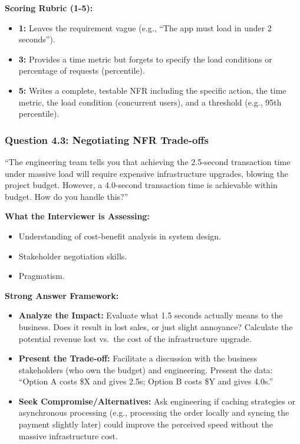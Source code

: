 \textbf{Scoring Rubric (1-5):}

\begin{itemize}
\tightlist
\item
  \textbf{1:} Leaves the requirement vague (e.g., ``The app must load in
  under 2 seconds'').
\item
  \textbf{3:} Provides a time metric but forgets to specify the load
  conditions or percentage of requests (percentile).
\item
  \textbf{5:} Writes a complete, testable NFR including the specific
  action, the time metric, the load condition (concurrent users), and a
  threshold (e.g., 95th percentile).
\end{itemize}

\subsubsection{Question 4.3: Negotiating NFR
Trade-offs}\label{question-4.3-negotiating-nfr-trade-offs}

``The engineering team tells you that achieving the 2.5-second
transaction time under massive load will require expensive
infrastructure upgrades, blowing the project budget. However, a
4.0-second transaction time is achievable within budget. How do you
handle this?''

\textbf{What the Interviewer is Assessing:}

\begin{itemize}
\tightlist
\item
  Understanding of cost-benefit analysis in system design.
\item
  Stakeholder negotiation skills.
\item
  Pragmatism.
\end{itemize}

\textbf{Strong Answer Framework:}

\begin{itemize}
\tightlist
\item
  \textbf{Analyze the Impact:} Evaluate what 1.5 seconds actually means
  to the business. Does it result in lost sales, or just slight
  annoyance? Calculate the potential revenue lost vs.~the cost of the
  infrastructure upgrade.
\item
  \textbf{Present the Trade-off:} Facilitate a discussion with the
  business stakeholders (who own the budget) and engineering. Present
  the data: ``Option A costs \$X and gives 2.5s; Option B costs \$Y and
  gives 4.0s.''
\item
  \textbf{Seek Compromise/Alternatives:} Ask engineering if caching
  strategies or asynchronous processing (e.g., processing the order
  locally and syncing the payment slightly later) could improve the
  perceived speed without the massive infrastructure cost.
\end{itemize}

